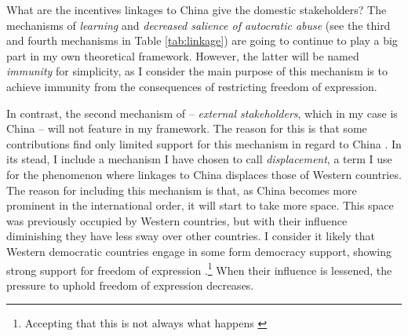 What are the incentives linkages to China give the domestic stakeholders? The mechanisms of \textit{learning} and \textit{decreased salience of autocratic abuse} (see the third and fourth mechanisms in Table \ref{tab:linkage}) are going to continue to play a big part in my own theoretical framework. However, the latter will be named \textit{immunity} for simplicity, as I consider the main purpose of this mechanism is to achieve immunity from the consequences of restricting freedom of expression.

In contrast, the second mechanism of \citeauthor{tansey_ties_2017} -- \textit{external stakeholders}, which in my case is China -- will not feature in my framework. The reason for this is that some contributions find only limited support for this mechanism in regard to China \citep{chen_democracy_2015}. In its stead, I include a mechanism I have chosen to call \textit{displacement}, a term I use for the phenomenon where linkages to China displaces those of Western countries. The reason for including this mechanism is that, as China becomes more prominent in the international order, it will start to take more space. This space was previously occupied by Western countries, but with their influence diminishing they have less sway over other countries. I consider it likely that Western democratic countries engage in some form democracy support, showing strong support for freedom of expression \citep{levitsky_linkage_2006}.\footnote{Accepting that this is not always what happens \citep{chen_democracy_2015, wong_chinese_2019}} When their influence is lessened, the pressure to uphold freedom of expression decreases.

